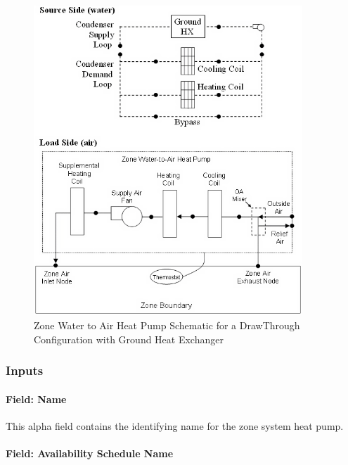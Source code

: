 \begin{figure}[hbtp] %
\centering
\includegraphics[width=0.9\textwidth, height=0.9\textheight, keepaspectratio=true]{media/image288.png}
\caption{Zone Water to Air Heat Pump Schematic for a DrawThrough Configuration with Ground Heat Exchanger \protect \label{fig:zone-water-to-air-heat-pump-schematic-for-a}}
\end{figure}

\subsubsection{Inputs}\label{inputs-11-023}

\paragraph{Field: Name}\label{field-name-11-017}

This alpha field contains the identifying name for the zone system heat pump.

\paragraph{Field: Availability Schedule Name}\label{field-availability-schedule-name-10-001}

